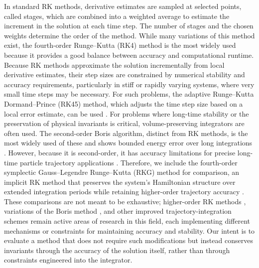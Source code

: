 \documentclass[draft]{agujournal2019}
\begin{document}
In standard RK methods, derivative estimates are sampled at selected points, called stages, which are combined into a weighted average to estimate the increment in the solution at each time step. The number of stages and the chosen weights determine the order of the method. While many variations of this method exist, the fourth-order Runge--Kutta (RK4) method is the most widely used \cite{Chapra2021, Walters2022} because it provides a good balance between accuracy and computational runtime. Because RK methods approximate the solution incrementally from local derivative estimates, their step sizes are constrained by numerical stability and accuracy requirements, particularly in stiff or rapidly varying systems, where very small time steps may be necessary. For such problems, the adaptive Runge--Kutta Dormand--Prince (RK45) method, which adjusts the time step size based on a local error estimate, can be used \cite{Chapra2021, Dormand1980}. For problems where long-time stability or the preservation of physical invariants is critical, volume-preserving integrators are often used. The second-order Boris algorithm, distinct from RK methods, is the most widely used of these and shows bounded energy error over long integrations \cite{Qin2013, Ripperda2018}. However, because it is second-order, it has accuracy limitations for precise long-time particle trajectory applications \cite{Qin2013, Ripperda2018, Winkel2015}. Therefore, we include the fourth-order symplectic Gauss--Legendre Runge--Kutta (RKG) method for comparison, an implicit RK method that preserves the system's Hamiltonian structure over extended integration periods while retaining higher-order trajectory accuracy \cite{Iserles1996, Yugo2001, Calvo2003}. These comparisons are not meant to be exhaustive; higher-order RK methods \cite{Walters2022, Meseguer2025}, variations of the Boris method \cite{Wang2025}, and other improved trajectory-integration schemes \cite{Soni2021, Brizard2022, Huang2022, Umeda2023} remain active areas of research in this field, each implementing different mechanisms or constraints for maintaining accuracy and stability. Our intent is to evaluate a method that does not require such modifications but instead conserves invariants through the accuracy of the solution itself, rather than through constraints engineered into the integrator. 
\end{document}
